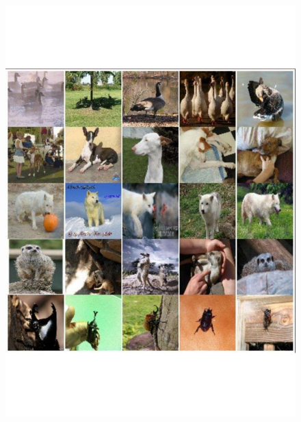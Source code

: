 \documentclass{article}
\theoremstyle{plain}
\theoremstyle{definition}
\theoremstyle{remark}
\begin{document}
\begin{figure}
    \centering
    \begin{minipage}[b]{0.45\textwidth}
        \includegraphics[width=1.\linewidth]{./cond_sampling_original.pdf}
    \end{minipage}
    \hfill
    \begin{minipage}[b]{0.45\textwidth}


\end{minipage}
\end{figure}
\end{document}
